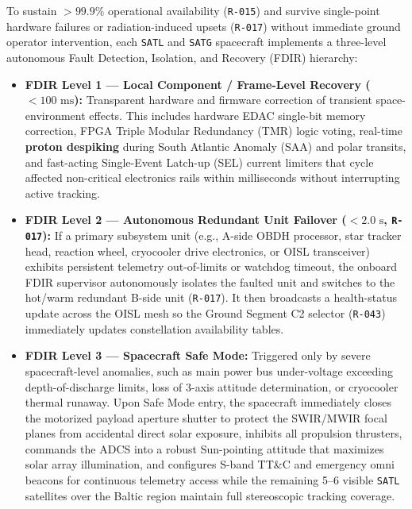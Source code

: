 \documentclass[11pt,a4paper]{article}
\providecommand{\abbr}[1]{#1}
\begin{document}
To sustain $> 99.9\%$ operational availability (\texttt{R-015}) and survive single-point hardware failures or radiation-induced upsets (\texttt{R-017}) without immediate ground operator intervention, each \texttt{SATL} and \texttt{SATG} spacecraft implements a three-level autonomous Fault Detection, Isolation, and Recovery (\abbr{FDIR}) hierarchy:
\begin{itemize}
    \item \textbf{FDIR Level 1 --- Local Component / Frame-Level Recovery ($< 100\text{ ms}$):} Transparent hardware and firmware correction of transient space-environment effects. This includes hardware \abbr{EDAC} single-bit memory correction, FPGA Triple Modular Redundancy (\abbr{TMR}) logic voting, real-time \textbf{proton despiking} during South Atlantic Anomaly (\abbr{SAA}) and polar transits, and fast-acting Single-Event Latch-up (\abbr{SEL}) current limiters that cycle affected non-critical electronics rails within milliseconds without interrupting active tracking.
    \item \textbf{FDIR Level 2 --- Autonomous Redundant Unit Failover ($< 2.0\text{ s}$, \texttt{R-017}):} If a primary subsystem unit (e.g., A-side \abbr{OBDH} processor, star tracker head, reaction wheel, cryocooler drive electronics, or \abbr{OISL} transceiver) exhibits persistent telemetry out-of-limits or watchdog timeout, the onboard \abbr{FDIR} supervisor autonomously isolates the faulted unit and switches to the hot/warm redundant B-side unit (\texttt{R-017}). It then broadcasts a health-status update across the \abbr{OISL} mesh so the Ground Segment C2 selector (\texttt{R-043}) immediately updates constellation availability tables.
    \item \textbf{FDIR Level 3 --- Spacecraft Safe Mode:} Triggered only by severe spacecraft-level anomalies, such as main power bus under-voltage exceeding depth-of-discharge limits, loss of 3-axis attitude determination, or cryocooler thermal runaway. Upon Safe Mode entry, the spacecraft immediately closes the motorized payload aperture shutter to protect the \abbr{SWIR}/\abbr{MWIR} focal planes from accidental direct solar exposure, inhibits all propulsion thrusters, commands the \abbr{ADCS} into a robust Sun-pointing attitude that maximizes solar array illumination, and configures S-band \abbr{TT\&C} and emergency omni beacons for continuous telemetry access while the remaining 5--6 visible \texttt{SATL} satellites over the Baltic region maintain full stereoscopic tracking coverage.
\end{itemize}
\end{document}
